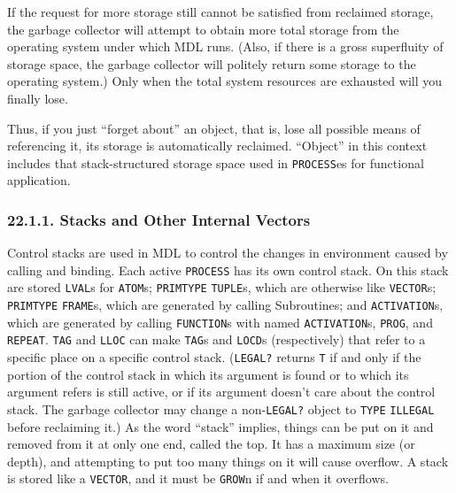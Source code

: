 \documentclass[a4paper,]{article}
\begin{document}
If the request for more storage still cannot be satisfied from reclaimed storage, the garbage collector will attempt to
obtain more total storage from the operating system under which MDL runs. (Also, if there is a gross superfluity of storage
space, the garbage collector will politely return some storage to the operating system.) Only when the total system
resources are exhausted will you finally lose.

Thus, if you just ``forget about'' an object, that is, lose all possible means of referencing it, its storage is
automatically reclaimed. ``Object'' in this context includes that stack-structured storage space used in \texttt{PROCESS}es
for functional application.

\subsubsection{22.1.1. Stacks and Other Internal Vectors}\label{stacks-and-other-internal-vectors}

Control stacks are used in MDL to control the changes in environment caused by calling and binding. Each active
\texttt{PROCESS} has its own control stack. On this stack are stored
\texttt{LVAL}s for \texttt{ATOM}s; \texttt{PRIMTYPE} \texttt{TUPLE}s, which are
otherwise like \texttt{VECTOR}s; \texttt{PRIMTYPE} \texttt{FRAME}s, which are generated by calling
Subroutines; and \texttt{ACTIVATION}s, which are generated by calling \texttt{FUNCTION}s with
named \texttt{ACTIVATION}s, \texttt{PROG}, and \texttt{REPEAT}. \texttt{TAG} and
\texttt{LLOC} can make \texttt{TAG}s and \texttt{LOCD}s (respectively) that refer
to a specific place on a specific control stack. (\texttt{LEGAL?} returns \texttt{T} if and
only if the portion of the control stack in which its argument is found or to which its argument refers is still active, or
if its argument doesn't care about the control stack. The garbage collector may change a non-\texttt{LEGAL?} object to
\texttt{TYPE} \texttt{ILLEGAL} before reclaiming it.) As the word
``stack'' implies, things can be put on it and removed from it at only one end, called the top. It has a maximum size (or
depth), and attempting to put too many things on it will cause overflow. A stack is stored like a \texttt{VECTOR}, and it
must be \texttt{GROW}n if and when it overflows.
\end{document}
